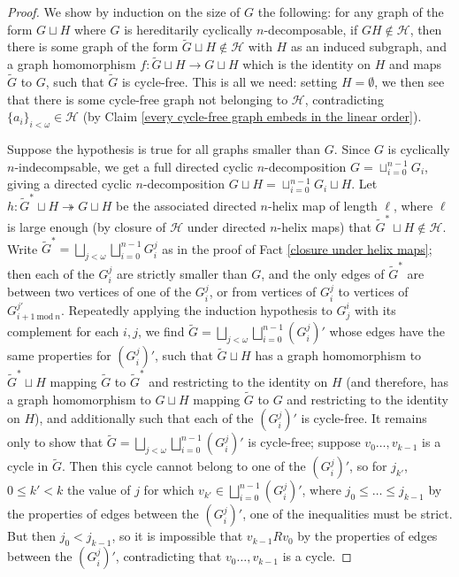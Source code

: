 \documentclass{amsart}
\theoremstyle{definition}
\theoremstyle{remark}
\numberwithin{equation}{section}
\begin{document}
\begin{proof}
    We show by induction on the size of $G$ the following: for any graph of the form $G \sqcup H$ where $G$ is hereditarily cyclically $n$-decomposable, if $G H \notin \mathcal{H}$, then there is some graph of the form $\tilde{G} \sqcup H \notin \mathcal{H}$ with $H$ as an induced subgraph, and a graph homomorphism $f: \tilde{G} \sqcup H \to G \sqcup H$ which is the identity on $H$ and maps $\tilde{G}$ to $G$, such that $\tilde{G}$ is cycle-free. This is all we need: setting $H = \emptyset$, we then see that there is some cycle-free graph not belonging to $\mathcal{H}$, contradicting $\{a_{i}\}_{i < \omega} \in \mathcal{H}$ (by Claim \ref{every cycle-free graph embeds in the linear order}).


    Suppose the hypothesis is true for all graphs smaller than $G$. Since $G$ is cyclically $n$-indecompsable, we get a full directed cyclic $n$-decomposition $G = \sqcup^{n-1}_{i =0} G_{i}$, giving a directed cyclic $n$-decomposition $G \sqcup H = \sqcup^{n-1}_{i =0} G_{i} \sqcup H$. Let $h: \tilde{G}^{*} \sqcup H \twoheadrightarrow G \sqcup H$ be the associated directed $n$-helix map of length $\ell$, where $\ell$ is large enough (by closure of $\mathcal{H}$ under directed $n$-helix maps) that $ \tilde{G}^{*} \sqcup H \notin \mathcal{H}$. Write $\tilde{G}^{*} = \bigsqcup_{j < \omega}\bigsqcup^{n-1}_{i =0} G^{j}_{i}$ as in the proof of Fact \ref{closure under helix maps}; then each of the $G^{j}_{i}$ are strictly smaller than $G$, and the only edges of $\tilde{G}^{*}$ are between two vertices of one of the $G^{j}_{i}$, or from vertices of $G^{j}_{i}$ to vertices of $G^{j'}_{i + 1 \mathrm{\: mod \:} n}$. Repeatedly applying the induction hypothesis to $G^{i}_{j}$ with its complement for each $i, j$, we find $\tilde{G} = \bigsqcup_{j < \omega}\bigsqcup^{n-1}_{i =0} (G^{j}_{i})'$ whose edges have the same properties for $(G^{j}_{i})'$, such that $\tilde{G} \sqcup H$ has a graph homomorphism to $\tilde{G}^{*} \sqcup H$ mapping $\tilde{G}$ to $\tilde{G}^{*}$ and restricting to the identity on $H$ (and therefore, has a graph homomorphism to $G \sqcup H$ mapping $\tilde{G}$ to $G$ and restricting to the identity on $H$), and additionally such that each of the $(G^{j}_{i})'$ is cycle-free. It remains only to show that $\tilde{G} = \bigsqcup_{j < \omega}\bigsqcup^{n-1}_{i =0} (G^{j}_{i})'$  is cycle-free; suppose $v_{0} \ldots, v_{k-1}$ is a cycle in $\tilde{G}$. Then this cycle cannot belong to one of the $(G^{j}_{i})'$, so for $j_{k'}$, $0 \leq k' <k$ the value of $j$ for which $v_{k'} \in \bigsqcup^{n-1}_{i =0} (G^{j}_{i})'$, where $j_{0} \leq \ldots \leq j_{k-1}$ by the properties of edges between the $(G^{j}_{i})'$, one of the inequalities must be strict. But then $j_{0} < j_{k-1}$, so it is impossible that $v_{k-1} R v_{0}$ by the properties of edges between the $(G^{j}_{i})'$, contradicting that $v_{0} \ldots, v_{k-1}$ is a cycle.
\end{proof}
\end{document}
